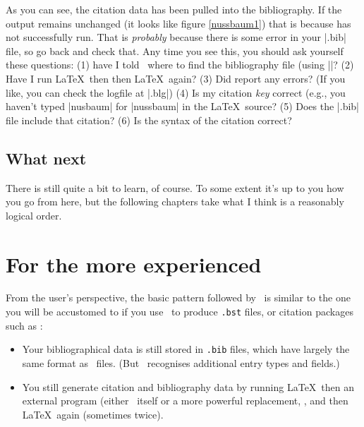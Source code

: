 As you can see, the citation data has been pulled into the
bibliography. If the output remains unchanged (it looks like figure
\ref{nussbaum1}) that is because  has not successfully
run. That is \emph{probably} because there is some error in your
|.bib| file, so go back and check that. Any time you see this, you
should ask yourself these
questions: (1) have I told \biblatex\ where
to find the bibliography file (using ||? (2) Have I
run \LaTeX\ then  then \LaTeX\ again? (3) Did
 report any errors? (If you like, you can check the logfile at
|.blg|) (4) Is my citation \emph{key} correct (e.g.,
you haven't typed |nusbaum| for |nussbaum| in the \LaTeX\ source? (5)
Does the |.bib| file include that citation? (6) Is the syntax of the
citation correct?

\subsection{What next}

There is still quite a bit to learn, of course. To some extent it's up
to you how you go from here, but the following chapters take what I
think is a reasonably logical order.

\section{For the more experienced}
\label{expert}

From the user's perspective, the basic pattern followed by \biblatex\
is similar to the one you will be accustomed to if you use \bibtex\
to produce \verb|.bst| files, or citation packages such as :
\begin{itemize}
\item Your bibliographical data is still stored in \verb|.bib| files,
  which have largely the same format as \bibtex\ files. (But
  \biblatex\ recognises additional entry types and fields.)
\item You still generate citation and bibliography data by running
  \LaTeX\, then an external program (either \bibtex\ itself or a more
  powerful replacement, \package{Biber}, and then \LaTeX\ again
  (sometimes twice).
\end{itemize}

